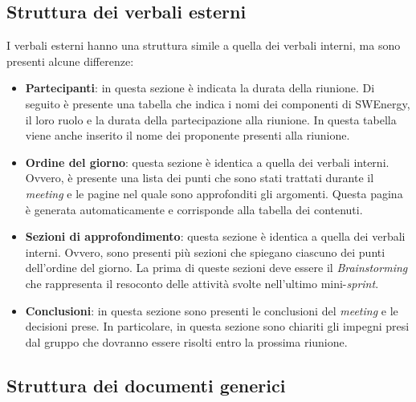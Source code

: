 \subsection{Struttura dei verbali esterni}
I verbali esterni hanno una struttura simile a quella dei verbali interni, ma
sono presenti alcune differenze:
\begin{itemize}
	\item \textbf{Partecipanti}: in questa sezione è indicata la durata della
	      riunione. Di seguito è presente una tabella che indica i nomi dei
	      componenti di SWEnergy, il loro ruolo e la durata della partecipazione
	      alla riunione. In questa tabella viene anche inserito il nome dei
	      proponente presenti alla riunione.

	\item \textbf{Ordine del giorno}: questa sezione è identica a quella dei
	      verbali interni. Ovvero, è presente una lista dei punti che sono stati
	      trattati durante il \textit{meeting} e le pagine nel quale sono
	      approfonditi gli argomenti. Questa pagina è generata automaticamente
	      e corrisponde alla tabella dei contenuti.

	\item \textbf{Sezioni di approfondimento}: questa sezione è identica a
	      quella dei verbali interni. Ovvero, sono presenti più sezioni che
	      spiegano ciascuno dei punti dell'ordine del giorno. La prima di queste
	      sezioni deve essere il \textit{Brainstorming} che rappresenta il
	      resoconto delle attività svolte nell'ultimo mini-\textit{sprint}.

	\item \textbf{Conclusioni}: in questa sezione sono presenti le conclusioni
	      del \textit{meeting} e le decisioni prese. In particolare, in questa
	      sezione sono chiariti gli impegni presi dal gruppo che dovranno essere
	      risolti entro la prossima riunione.
\end{itemize}

\subsection{Struttura dei documenti generici}

